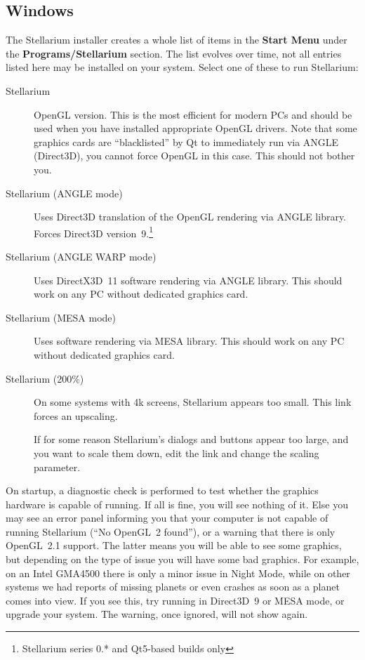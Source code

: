 \subsection{Windows}
\label{sec:GettingStarted:Running:Windows}

The Stellarium installer creates a whole list of items in the
\textbf{Start Menu} under the \textbf{Programs/Stellarium}
section. The list evolves over time, not all entries listed here 
may be installed on your system. Select one of these to run Stellarium:
\begin{description}
\item[Stellarium] OpenGL version. This is the most efficient for
  modern PCs and should be used when you have installed appropriate
  OpenGL drivers. Note that some graphics cards are ``blacklisted'' by
  Qt to immediately run via ANGLE (Direct3D), you cannot force OpenGL in this
  case. This should not bother you.
\item[Stellarium (ANGLE mode)] Uses Direct3D translation of the OpenGL
  rendering via ANGLE library.  Forces Direct3D version~9.\footnote{\label{FN:0-Qt5-only}Stellarium series 0.* and Qt5-based builds only}
\item[Stellarium (ANGLE WARP mode)] Uses DirectX3D~11 software
    rendering via ANGLE library. This should work on any PC without
    dedicated graphics card.
\item[Stellarium (MESA mode)] Uses software rendering via MESA
  library. This should work on any PC without dedicated graphics card.
\item[Stellarium (200\%)] On some systems with 4k screens, Stellarium appears too small. 
This link forces an upscaling. 

If for some reason Stellarium's dialogs and buttons appear too large, and you want to scale them down, 
edit the link and change the scaling parameter. 
\end{description}
On startup, a diagnostic check is performed to test whether the
graphics hardware is capable of running. If all is fine, you will see
nothing of it.  Else you may see an error panel informing you that
your computer is not capable of running Stellarium (``No OpenGL~2
found''), or a warning that there is only OpenGL~2.1 support. The
latter means you will be able to see some graphics, but depending on
the type of issue you will have some bad graphics. For example, on an
Intel GMA4500 there is only a minor issue in Night Mode, while on
other systems we had reports of missing planets or even crashes as
soon as a planet comes into view. If you see this, try running in
Direct3D~9 or MESA mode, or upgrade your system. The warning, once
ignored, will not show again.

